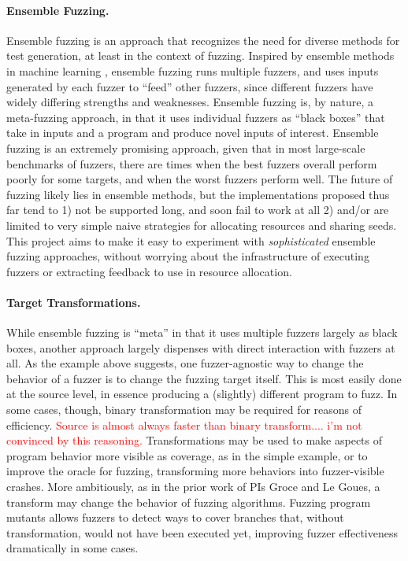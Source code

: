 \documentclass[numbers]{proposalnsf}
\newcommand{\jdh}[1]{\textcolor{red}{#1}}
\begin{document}
\paragraph{Ensemble Fuzzing.}   Ensemble fuzzing \cite{chen2019enfuzz} is an approach that recognizes the need for
diverse methods for test generation, at least in the context of
fuzzing.   Inspired by ensemble methods in machine learning \cite{dietterich2002ensemble},
ensemble fuzzing runs multiple fuzzers, and uses inputs generated by
each fuzzer to ``feed'' other fuzzers, since different fuzzers have widely differing strengths and weaknesses. Ensemble fuzzing is, by nature, a meta-fuzzing approach, in that it uses individual fuzzers as ``black boxes'' that take in inputs and a program and produce novel inputs of interest.  Ensemble fuzzing is an extremely promising approach, given that in most large-scale benchmarks of fuzzers, there are times when the best fuzzers overall perform poorly for some targets, and when the worst fuzzers perform well.  The future of fuzzing likely lies in ensemble methods, but the implementations proposed thus far tend to 1) not be supported long, and soon fail to work at all 2) and/or are limited to very simple naive strategies for allocating resources and sharing seeds.  This project aims to make it easy to experiment with \emph{sophisticated} ensemble fuzzing approaches, without worrying about the infrastructure of executing fuzzers or extracting feedback to use in resource allocation.

\paragraph{Target Transformations.}  While ensemble fuzzing is ``meta'' in that it uses multiple fuzzers largely as black boxes, another approach largely dispenses with direct interaction with fuzzers at all.  As the example above suggests, one fuzzer-agnostic way to change the behavior of a fuzzer is to change the fuzzing target itself.  This is most easily done at the source level, in essence producing a (slightly) different program to fuzz.  In some cases, though, binary transformation may be required for reasons of efficiency.  \jdh{Source is almost always faster than binary transform.... i'm not convinced by this reasoning.} Transformations may be used to make aspects of program behavior more visible as coverage, as in the simple example, or to improve the oracle for fuzzing, transforming more behaviors into fuzzer-visible crashes.  More ambitiously, as in the prior work of PIs Groce and Le Goues, a transform may change the behavior of fuzzing algorithms.  Fuzzing program mutants allows fuzzers to detect ways to cover branches that, without transformation, would not have been executed yet, improving fuzzer effectiveness dramatically in some cases.
\end{document}
